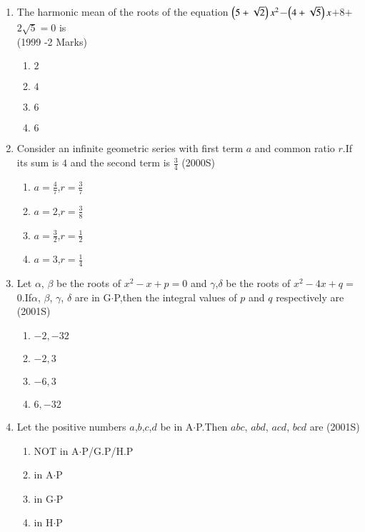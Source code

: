 \documentclass[journal,12pt,twocolumn]{IEEEtran}
\theoremstyle{remark}
\begin{document}
\begin{enumerate} [start=5]
\begin{enumerate}
        \item $3$
        \item $5$
        \item $6$
    \end{enumerate}
    \item The harmonic mean of the roots of the equation $\left(5+\sqrt{2}\right)x^2$$-$$\left(4+\sqrt{5}\right)x$$+$$8$$+$$2\sqrt{5}$$=$$0$ is \\
    \hfill(1999 -2 Marks)
    \begin{enumerate}
        \item $2$
        \item $4$
        \item $6$
        \item $6$
    \end{enumerate}
    \item Consider an infinite geometric series with first term $a$ and common ratio $r$.If its sum is $4$ and the second term is $\frac{3}{4}$
    \hfill(2000S)
    \begin{enumerate}
        \item $a=\frac{4}{7}$,$r=\frac{3}{7}$
        \item $a=2$,$r=\frac{3}{8}$
        \item $a=\frac{3}{2}$,$r=\frac{1}{2}$
        \item $a=3$,$r=\frac{1}{4}$
    \end{enumerate}
    \item Let $\alpha$, $\beta$ be the roots of $x^2-x+p$$=$$0$ and $\gamma $,$\delta$ be the roots of $x^2-4x+q$$=$$0$.If$ \alpha$, $\beta$, $\gamma$, $\delta$ are in G$\cdot$P,then the integral values of $p$ and $q$ respectively are
    \hfill(2001S)
    \begin{enumerate}
        \item $-2,-32$
        \item $-2,3$
       \item $-6,3$
        \item $6,-32$
    \end{enumerate}
    \item Let the positive numbers $a$,$b$,$c$,$d$ be in A$\cdot$P.Then $abc$, $abd$, $acd$, $bcd$ are
    \hfill(2001S)
    \begin{enumerate}
        \item NOT  in A$\cdot$P/G.P/H.P
        \item in A$\cdot$P
        \item in G$\cdot$P
        \item in H$\cdot$P

\end{enumerate}
\end{enumerate}
\end{document}
